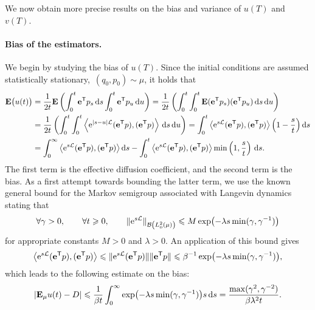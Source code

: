 \documentclass[11pt,a4paper]{article}
\newcommand{\e}{\mathrm{e}}
\newcommand{\expect}[0]{\mathbf{E}}
\newcommand{\vect}[1]{\boldsymbol{\mathbf #1}}
\renewcommand{\d}{\mathrm d}
\renewcommand{\t}{\mathsf T}
\theoremstyle{plain}
\numberwithin{equation}{section}
\renewcommand{\leq}{\leqslant}
\renewcommand{\geq}{\geqslant}
\begin{document}
We now obtain more precise results on the bias and variance of $u(T)$ and $v(T)$.

\paragraph{Bias of the estimators.}%
We begin by studying the bias of $u(T)$.
Since the initial conditions are assumed statistically stationary,~$(q_0, p_0) \sim \mu$,
it holds that
\begin{equation}
\label{eq:bias_without_control}
\begin{aligned}
    \expect \bigl(u(t)\bigr)
    &= \frac{1}{2t} \expect \left( \int_{0}^{t} \vect e^\t p_s \, \d s \int_{0}^{t} \vect e^\t p_u \, \d u \right)
    = \frac{1}{2t} \left( \int_{0}^{t} \int_{0}^{t} \expect (\vect e^\t p_s) (\vect e^\t p_u) \, \d s \, \d u \right) \\
    &= \frac{1}{2t} \left( \int_{0}^{t} \int_{0}^{t} \ip{\e^{\abs{s - u} \mathcal L}(\vect e^\t p)}{(\vect e^\t p)} \, \d s \, \d u \right)
    =  \int_{0}^{t} \ip{\e^{s \mathcal L} (\vect e^\t p)}{(\vect e^\t p)} \left(1 - \frac{s}{t}\right) \d s  \\
    &= \int_{0}^{\infty} \ip{\e^{s \mathcal L}(\vect e^\t p)}{(\vect e^\t p)}  \d s - \int_{0}^{t} \ip{\e^{s \mathcal L} (\vect e^\t p)}{(\vect e^\t p)} \min\left(1, \frac{s}{t}\right) \, \d s.
\end{aligned}
\end{equation}
The first term is the effective diffusion coefficient,
and the second term is the bias.
As a first attempt towards bounding the latter term,
we use the known general bound for the Markov semigroup associated with Langevin dynamics~\cite{roussel2018spectral}
stating that
\begin{equation}
    \label{eq:decay_semigroup_general}
    \forall \gamma > 0, \qquad \forall t \geq 0, \qquad
    \norm*{ \e^{s \mathcal L} }[\mathcal B \left(L^2_0\left(\mu\right) \right)] \leq M \exp \bigl(- \lambda s \min(\gamma, \gamma^{-1}) \bigr)
\end{equation}
for appropriate constants $M > 0$ and $\lambda > 0$.
An application of this bound gives
\[
    \ip{\e^{s \mathcal L}(\vect e^\t p)}{(\vect e^\t p)}
    \leq \norm*{\e^{s \mathcal L}(\vect e^\t p)} \norm*{\vect e^\t p}
    \leq \beta^{-1} \exp\bigl(- \lambda s \min(\gamma, \gamma^{-1})\bigr),
\]
which leads to the following estimate on the bias:
\begin{equation}
    \label{eq:bias}
    \abs{\expect_{\mu} u(t) - D}
    \leq \frac{1}{\beta t}\int_{0}^{\infty} \exp\bigl(- \lambda s \min(\gamma, \gamma^{-1})\bigr) s \, \d s
    = \frac{\max (\gamma^2, \gamma^{-2})}{\beta \lambda^2 t}.
\end{equation}
\end{document}
